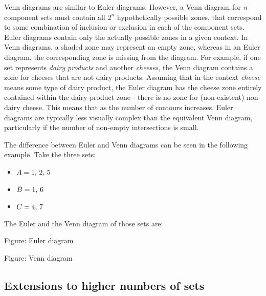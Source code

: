 Venn diagrams are similar to Euler diagrams. However, a Venn diagram for \textit{n}
component sets must contain all $2^n$ hypothetically possible zones, that correspond to
some combination of inclusion or exclusion in each of the component sets. Euler diagrams
contain only the actually possible zones in a given context. In Venn diagrams, a shaded
zone may represent an empty zone, whereas in an Euler diagram, the corresponding zone is
missing from the diagram. For example, if one set represents \textit{dairy products} and
another \textit{cheeses}, the Venn diagram contains a zone for cheeses that are not dairy
products. Assuming that in the context \textit{cheese} means some type of dairy product,
the Euler diagram has the cheese zone entirely contained within the dairy-product
zone—there is no zone for (non-existent) non-dairy cheese. This means that as the number
of contours increases, Euler diagrams are typically less visually complex than the
equivalent Venn diagram, particularly if the number of non-empty intersections is small.



The difference between Euler and Venn diagrams can be seen in the following example. Take
the three sets:



\begin{itemize}
    \item $A = \\{1,\, 2,\, 5\\}$
    \item $B = \\{1,\, 6\\}$
    \item $C = \\{4,\, 7\\}$
\end{itemize}

The Euler and the Venn diagram of those sets are:






Figure: Euler diagram






Figure: Venn diagram




\subsection{Extensions to higher numbers of sets}
\label{sss:exte-b1a3}




